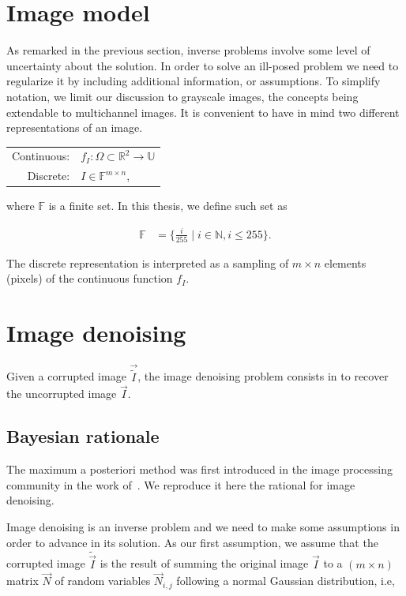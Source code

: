 \section{Image model}
As remarked in the previous section, inverse problems involve some level of uncertainty about the solution. In order to solve an ill-posed problem we need to regularize it by including additional information, or assumptions. To simplify notation, we limit our discussion to grayscale images, the concepts being extendable to multichannel images. It is convenient to have in mind two different representations of an image. \\

\begin{center}
\begin{tabular}{rl}
	Continuous: & $f_I: \Omega \subset \mathbb{R}^2 \rightarrow \mathbb{U}$ \\
	Discrete: & $I \in \mathbb{F}^{m \times n}$,
\end{tabular}
\end{center}

where $\mathbb{F}$ is a finite set. In this thesis, we define such set as

\begin{align}
	\mathbb{F} &= \{ \frac{i}{255} \; | \; i \in \mathbb{N}, i \leq 255 \}.
\end{align}

The discrete representation is interpreted as a sampling of $m \times n$ elements (pixels) of the continuous function $f_I$. 

\section{Image denoising}

Given a corrupted image $\vec{\widetilde{I}}$, the image denoising problem consists in to recover the uncorrupted image $\vec{I}$.

\subsection{Bayesian rationale}
The maximum a posteriori method was first introduced in the image processing community in the work of~\cite{geman84}. We reproduce it here the rational for image denoising.

Image denoising is an inverse problem and we need to make some assumptions in order to advance in its solution. As our first assumption, we assume that the corrupted image $\widetilde{\vec{I}}$ is the result of summing the original image $\vec{I}$ to a $(m \times n)$ matrix $\vec{N}$ of random variables $\vec{N}_{i,j}$ following a normal Gaussian distribution, i.e, 

